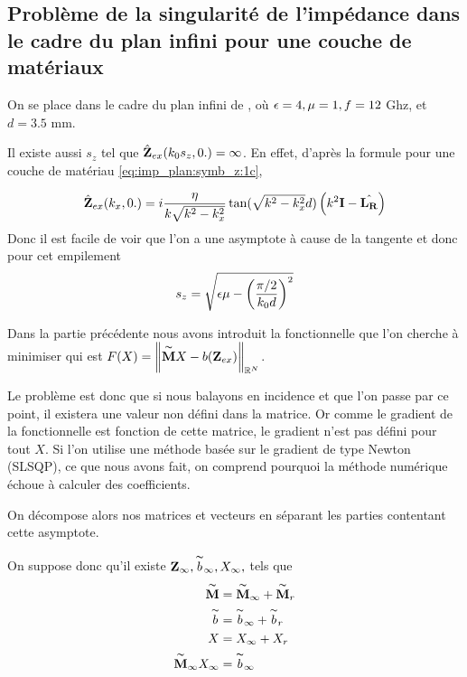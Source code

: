 \subsection{Problème de la singularité de l'impédance dans le cadre du plan infini pour une couche de matériaux}
On se place dans le cadre du plan infini de \cite{aubakirov_electromagnetic_2014}, où \(\epsilon=4,\mu=1,f=12\) Ghz, et \(d=3.5\) mm. %

Il existe aussi \(s_z\) tel que \(\hat{\mathbf{Z}}_{ex}(k_0s_z,0.) = \infty\). En effet, d'après la formule pour une couche de matériau \eqref{eq:imp_plan:symb_z:1c}, 

\begin{equation}
  \hat{\mathbf{Z}}_{ex}(k_x,0.) = i\dfrac{\eta}{k\sqrt{k^2 - k_x^2}}\tan(\sqrt{k^2 - k_x^2}d)\left(k^2\mathbf{I} - \hat{\mathbf{L_R}}\right)
\end{equation}
Donc il est facile de voir que l'on a une asymptote à cause de la tangente et donc pour cet empilement
\begin{equation}
  s_z = \sqrt{\epsilon \mu - \left(\dfrac{\pi/2}{k_0 d}\right)^2}
\end{equation}

Dans la partie précédente nous avons introduit la fonctionnelle que l'on cherche à minimiser qui est \(F(X) = \left\lVert\overset{\thicksim}{\mathbf{M}} X - b(\mathbf{Z}_{ex})\right\rVert_{\mathbb R^N}\).

Le problème est donc que si nous balayons en incidence et que l'on passe par ce point, il existera une valeur non défini dans la matrice. Or comme le gradient de la fonctionnelle est fonction de cette matrice, le gradient n'est pas défini pour tout \(X\). Si l'on utilise une méthode basée sur le gradient de type Newton (SLSQP), ce que nous avons fait, on comprend pourquoi la méthode numérique échoue à calculer des coefficients.

On décompose alors nos matrices et vecteurs en séparant les parties contentant cette asymptote.

On suppose donc qu'il existe \(\mathbf{Z}_\infty, \overset{\thicksim}{b}_\infty, X_\infty,\) tels que
\begin{align*}
  \overset{\thicksim}{\mathbf{M}} &= \overset{\thicksim}{\mathbf{M}}_\infty + \overset{\thicksim}{\mathbf{M}}_r
  \\
  \overset{\thicksim}{b} &= \overset{\thicksim}{b}_\infty + \overset{\thicksim}{b}_r
  \\
  X &= X_\infty + X_r
  \\
  \overset{\thicksim}{\mathbf{M}}_\infty X_\infty &= \overset{\thicksim}{b}_\infty
\end{align*}

